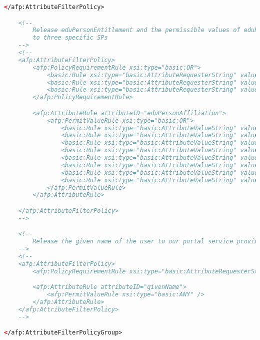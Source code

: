 \begin{lstlisting}[language=xml]
    </afp:AttributeFilterPolicy>

    <!-- 
        Release eduPersonEntitlement and the permissible values of eduPersonAffiliation
        to three specific SPs
    -->
    <!--
    <afp:AttributeFilterPolicy>
        <afp:PolicyRequirementRule xsi:type="basic:OR">
            <basic:Rule xsi:type="basic:AttributeRequesterString" value="urn:example.org:sp:Portal" />
            <basic:Rule xsi:type="basic:AttributeRequesterString" value="urn:example.org:sp:SIS" />
            <basic:Rule xsi:type="basic:AttributeRequesterString" value="urn:example.org:sp:LMS" />
        </afp:PolicyRequirementRule>

        <afp:AttributeRule attributeID="eduPersonAffiliation">
            <afp:PermitValueRule xsi:type="basic:OR">
                <basic:Rule xsi:type="basic:AttributeValueString" value="faculty" ignoreCase="true" />
                <basic:Rule xsi:type="basic:AttributeValueString" value="student" ignoreCase="true" />
                <basic:Rule xsi:type="basic:AttributeValueString" value="staff" ignoreCase="true" />
                <basic:Rule xsi:type="basic:AttributeValueString" value="alum" ignoreCase="true" />
                <basic:Rule xsi:type="basic:AttributeValueString" value="member" ignoreCase="true" />
                <basic:Rule xsi:type="basic:AttributeValueString" value="affiliate" ignoreCase="true" />
                <basic:Rule xsi:type="basic:AttributeValueString" value="employee" ignoreCase="true" />
                <basic:Rule xsi:type="basic:AttributeValueString" value="library-walk-in" ignoreCase="true" />
            </afp:PermitValueRule>
        </afp:AttributeRule>

    </afp:AttributeFilterPolicy>
    -->

    <!-- 
        Release the given name of the user to our portal service provider
    -->
    <!--
    <afp:AttributeFilterPolicy>
        <afp:PolicyRequirementRule xsi:type="basic:AttributeRequesterString" value="urn:example.org:sp:myPortal" />

        <afp:AttributeRule attributeID="givenName">
            <afp:PermitValueRule xsi:type="basic:ANY" />
        </afp:AttributeRule>
    </afp:AttributeFilterPolicy>
    -->

</afp:AttributeFilterPolicyGroup>
\end{lstlisting}

